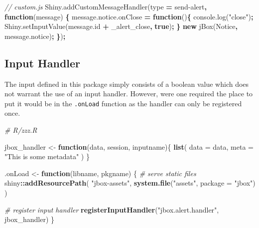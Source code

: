 \documentclass[
]{krantz}
\makeatletter
\newenvironment{Shaded}{\begin{snugshade}}{\end{snugshade}}
\newcommand{\AttributeTok}[1]{\textcolor[rgb]{0.61,0.61,0.61}{#1}}
\newcommand{\CommentTok}[1]{\textcolor[rgb]{0.37,0.37,0.37}{\textit{#1}}}
\newcommand{\ControlFlowTok}[1]{\textcolor[rgb]{0.27,0.27,0.27}{\textbf{#1}}}
\newcommand{\DataTypeTok}[1]{\textcolor[rgb]{0.27,0.27,0.27}{#1}}
\newcommand{\KeywordTok}[1]{\textcolor[rgb]{0.27,0.27,0.27}{\textbf{#1}}}
\newcommand{\NormalTok}[1]{#1}
\newcommand{\OperatorTok}[1]{\textcolor[rgb]{0.43,0.43,0.43}{\textbf{#1}}}
\newcommand{\StringTok}[1]{\textcolor[rgb]{0.5,0.5,0.5}{#1}}
\newcommand{\VariableTok}[1]{\textcolor[rgb]{0,0,0}{#1}}
\newenvironment{kframe}{%
\medskip{}
\setlength{\fboxsep}{.8em}
 \def\at@end@of@kframe{}%
 \ifinner\ifhmode%
  \def\at@end@of@kframe{\end{minipage}}%
  \begin{minipage}{\columnwidth}%
 \fi\fi%
 \def\FrameCommand##1{\hskip\@totalleftmargin \hskip-\fboxsep
 \colorbox{shadecolor}{##1}\hskip-\fboxsep
     \hskip-\linewidth \hskip-\@totalleftmargin \hskip\columnwidth}%
 \MakeFramed {\advance\hsize-\width
   \@totalleftmargin\z@ \linewidth\hsize
   \@setminipage}}%
 {\par\unskip\endMakeFramed%
 \at@end@of@kframe}
\renewenvironment{Shaded}{\begin{kframe}}{\end{kframe}}
\makeatother
\begin{document}
\begin{Shaded}
\begin{Highlighting}[]
\CommentTok{// custom.js}
\VariableTok{Shiny}\NormalTok{.}\AttributeTok{addCustomMessageHandler}\NormalTok{(type }\OperatorTok{=} \StringTok{\textquotesingle{}send{-}alert\textquotesingle{}}\OperatorTok{,} \KeywordTok{function}\NormalTok{(message) }\OperatorTok{\{}
  \VariableTok{message}\NormalTok{.}\VariableTok{notice}\NormalTok{.}\AttributeTok{onClose} \OperatorTok{=} \KeywordTok{function}\NormalTok{()}\OperatorTok{\{}
    \VariableTok{console}\NormalTok{.}\AttributeTok{log}\NormalTok{(}\StringTok{"close"}\NormalTok{)}\OperatorTok{;}
    \VariableTok{Shiny}\NormalTok{.}\AttributeTok{setInputValue}\NormalTok{(}\VariableTok{message}\NormalTok{.}\AttributeTok{id} \OperatorTok{+} \StringTok{\textquotesingle{}\_alert\_close\textquotesingle{}}\OperatorTok{,} \KeywordTok{true}\NormalTok{)}\OperatorTok{;}
  \OperatorTok{\}}
  \KeywordTok{new} \AttributeTok{jBox}\NormalTok{(}\StringTok{\textquotesingle{}Notice\textquotesingle{}}\OperatorTok{,} \VariableTok{message}\NormalTok{.}\AttributeTok{notice}\NormalTok{)}\OperatorTok{;}
\OperatorTok{\}}\NormalTok{)}\OperatorTok{;}
\end{Highlighting}
\end{Shaded}

\hypertarget{input-handler}{%
\subsection{Input Handler}\label{input-handler}}

The input defined in this package simply consists of a boolean value which does not warrant the use of an input handler. However, were one required the place to put it would be in the \texttt{.onLoad} function as the handler can only be registered once.

\begin{Shaded}
\begin{Highlighting}[]
\CommentTok{\# R/zzz.R}

\NormalTok{jbox\_handler <{-}}\StringTok{ }\ControlFlowTok{function}\NormalTok{(data, session, inputname)\{}
  \KeywordTok{list}\NormalTok{(}
    \DataTypeTok{data =}\NormalTok{ data,}
    \DataTypeTok{meta =} \StringTok{"This is some metadata"}
\NormalTok{  )}
\NormalTok{\}}

\NormalTok{.onLoad <{-}}\StringTok{ }\ControlFlowTok{function}\NormalTok{(libname, pkgname) \{}
  \CommentTok{\# serve static files}
\NormalTok{  shiny}\OperatorTok{::}\KeywordTok{addResourcePath}\NormalTok{(}
    \StringTok{"jbox{-}assets"}\NormalTok{,}
    \KeywordTok{system.file}\NormalTok{(}\StringTok{"assets"}\NormalTok{, }\DataTypeTok{package =} \StringTok{"jbox"}\NormalTok{)}
\NormalTok{  )}

  \CommentTok{\# register input handler}
  \KeywordTok{registerInputHandler}\NormalTok{(}\StringTok{"jbox.alert.handler"}\NormalTok{, jbox\_handler)}
\NormalTok{\}}
\end{Highlighting}
\end{Shaded}
\end{document}
